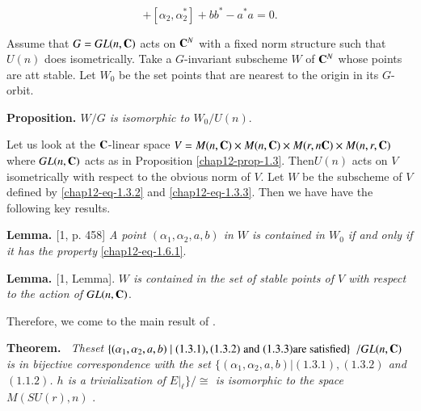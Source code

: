 \begin{equation}
[\alpha_{1}, \alpha_{1}^{*}] + [\alpha_{2}, \alpha_{2}^{*}] + bb^{*}-a^{*}a=0.\tag{1.6.1}\label{chap12-eq-1.6.1}
\end{equation}

Assume that $G=GL(n,\mathbf{C})$ acts on $\mathbf{C}^{N}$ with a fixed norm structure such that $U(n)$ does isometrically. Take a $G$-invariant subscheme $W$ of $\mathbf{C}^{N}$ whose points are att stable. Let $W_{0}$ be the set points that are nearest to the origin in its $G$-orbit.

\medskip
\noindent
{\bfseries {} Proposition. \label{chap12-prop-1.7}} \textit{$W/G$ is isomorphic to $W_{0}/U(n)$}.

Let us look at the $\mathbf{C}$-linear space $V=M(n,\mathbf{C}) \times M(n,\mathbf{C}) \times M(r,n \mathbf{C})\times M(n,r,\mathbf{C})$ where $GL(n,\mathbf{C})$ acts as in Proposition \ref{chap12-prop-1.3}. Then$U(n)$ acts on $V$ isometrically with respect to the obvious norm of $V$. Let $W$ be the subscheme of $V$ defined by \eqref{chap12-eq-1.3.2} and \eqref{chap12-eq-1.3.3}. Then we have have the following key results. 

\medskip
\noindent
{\bfseries {} Lemma. \label{chap12-Lemma-1.8}} [1, p. 458] \textit{A point $(\alpha_{1}, \alpha_{2}, a, b)$ in $W$ is contained in $W_{0}$ if and only if it has the property} \eqref{chap12-eq-1.6.1}.

\medskip
\noindent
{\bfseries {} Lemma. \label{chap12-Lemma-1.9}} [1, Lemma]. \textit{$W$ is contained in the set of stable points of $V$ with respect to the action of $GL(n,\mathbf{C})$}.

Therefore, we come to the main result of \cite{chap12-key1}.

\medskip
\noindent
{\bfseries {} Theorem. \label{chap12-Thm-1.10}}~\textit{The\pageoriginale set $\{(\alpha_{1}, \alpha_{2}, a, b)\; | \;(1.3.1), (1.3.2)\; \text{and} \;(1.3.3)\break \text{are satisfied} \}$ $/GL(n,\mathbf{C})$ is in bijective correspondence with the set \break $\{(\alpha_{1}, \alpha_{2}, a, b) | (1.3.1), (1.3.2)$ {\rm and} $(1.1.2)$. $h$ {\rm is a trivialization of} $E|_{\ell}\}/\cong$  is isomorphic to the space $M(SU(r),n)$ }.

